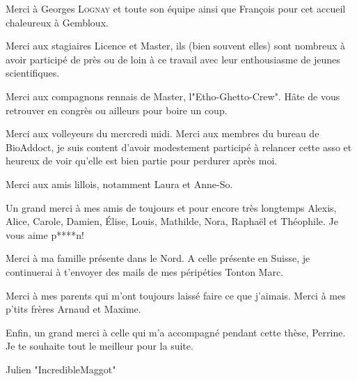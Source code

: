 \documentclass[11pt, oneside]{Thesis} %
\begin{document}
{Merci à Georges \textsc{Lognay} et toute son équipe ainsi que François pour cet accueil chaleureux à Gembloux. 

Merci aux stagiaires Licence et Master, ils (bien souvent elles) sont nombreux à avoir participé de près ou de loin à ce travail avec leur enthousiasme de jeunes scientifiques. 

Merci aux compagnons rennais de Master, l"Etho-Ghetto-Crew". Hâte de vous retrouver en congrès ou ailleurs pour boire un coup. 

Merci aux volleyeurs du mercredi midi. Merci aux membres du bureau de BioAddoct, je suis content d'avoir modestement participé à relancer cette asso et heureux de voir qu'elle est bien partie pour perdurer après moi. 

Merci aux amis lillois, notamment Laura et Anne-So. 

Un grand merci à mes amis de toujours et pour encore très longtemps Alexis, Alice, Carole, Damien, Élise, Louis, Mathilde, Nora, Raphaël et Théophile. Je vous aime p****n! 

Merci à ma famille présente dans le Nord. A celle présente en Suisse, je continuerai à t'envoyer des mails de mes péripéties Tonton Marc.

Merci à mes parents qui m'ont toujours laissé faire ce que j'aimais. Merci à mes p'tits frères Arnaud et Maxime. 

Enfin, un grand merci à celle qui m'a accompagné pendant cette thèse, Perrine. Je te souhaite tout le meilleur pour la suite.

\begin{flushright}
Julien "IncredibleMaggot"
\end{flushright}
}


\cleardoublepage

\pagestyle{fancy} %



\addto\captionsfrench{%
  \renewcommand{\contentsname}%
    {Table des matières}%
}

\tableofcontents %
\end{document}
